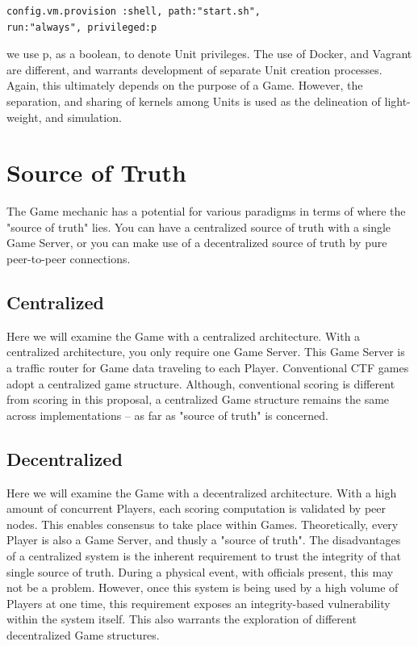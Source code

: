 \documentclass[10pt, titlepage, twocolumn]{article}
\newcommand{\ii}{\indent\indent}
\begin{document}
\begin{verbatim}
config.vm.provision :shell, path:"start.sh", 
run:"always", privileged:p
\end{verbatim}

we use p, as a boolean, to denote Unit privileges. The use of Docker, and Vagrant are different, and warrants development of separate Unit creation processes. Again, this ultimately depends on the purpose of a Game. However, the separation, and sharing of kernels among Units is used as the delineation of light-weight, and simulation.

\section{Source of Truth}
The Game mechanic has a potential for various paradigms in terms of where the "source of truth" lies. You can have a centralized source of truth with a single Game Server, or you can make use of a decentralized source of truth by pure peer-to-peer connections.

\subsection{Centralized}
\ii
Here we will examine the Game with a centralized architecture. With a centralized architecture, you only require one Game Server. This Game Server is a traffic router for Game data traveling to each Player. Conventional CTF games adopt a centralized game structure. Although, conventional scoring is different from scoring in this proposal, a centralized Game structure remains the same across implementations -- as far as "source of truth" is concerned.

\subsection{Decentralized}
\ii
Here we will examine the Game with a decentralized architecture. With a high amount of concurrent Players, each scoring computation is validated by peer nodes. This enables consensus to take place within Games. Theoretically, every Player is also a Game Server, and thusly a "source of truth". The disadvantages of a centralized system is the inherent requirement to trust the integrity of that single source of truth. During a physical event, with officials present, this may not be a problem. However, once this system is being used by a high volume of Players at one time, this requirement exposes an integrity-based vulnerability within the system itself. This also warrants the exploration of different decentralized Game structures.
\end{document}
